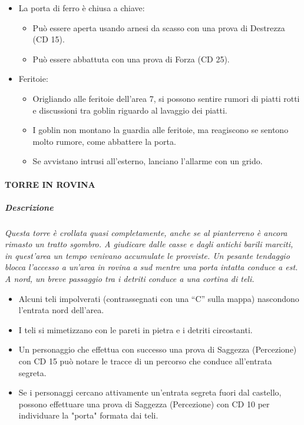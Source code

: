 \documentclass{article}
\begin{document}
    \begin{itemize}
        \item La porta di ferro è chiusa a chiave:
        \begin{itemize}
            \item Può essere aperta usando arnesi da scasso con una prova di Destrezza (CD 15).
            \item Può essere abbattuta con una prova di Forza (CD 25).
        \end{itemize}
        \item Feritoie:
        \begin{itemize}
            \item Origliando alle feritoie dell'area 7, si possono sentire rumori di piatti rotti e discussioni tra goblin riguardo al lavaggio dei piatti.
            \item I goblin non montano la guardia alle feritoie, ma reagiscono se sentono molto rumore, come abbattere la porta.
            \item Se avvistano intrusi all'esterno, lanciano l'allarme con un grido.
        \end{itemize}
    \end{itemize}

\paragraph{TORRE IN ROVINA}

    \subparagraph{Descrizione }\textit{Questa torre è crollata quasi completamente, anche se al
    pianterreno è ancora rimasto un tratto sgombro. A giudicare
    dalle casse e dagli antichi barili marciti, in quest'area un
    tempo venivano accumulate le provviste. Un pesante
    tendaggio blocca l’accesso a un’area in rovina a sud mentre
    una porta intatta conduce a est. A nord, un breve passaggio
    tra i detriti conduce a una cortina di teli.}

    \begin{itemize}
        \item Alcuni teli impolverati (contrassegnati con una “C” sulla mappa) nascondono l'entrata nord dell'area.
        \item I teli si mimetizzano con le pareti in pietra e i detriti circostanti.
        \item Un personaggio che effettua con successo una prova di Saggezza (Percezione) con CD 15 può notare le tracce di un percorso che conduce all'entrata segreta.
        \item Se i personaggi cercano attivamente un'entrata segreta fuori dal castello, possono effettuare una prova di Saggezza (Percezione) con CD 10 per individuare la "porta" formata dai teli.
    \end{itemize}
\end{document}
